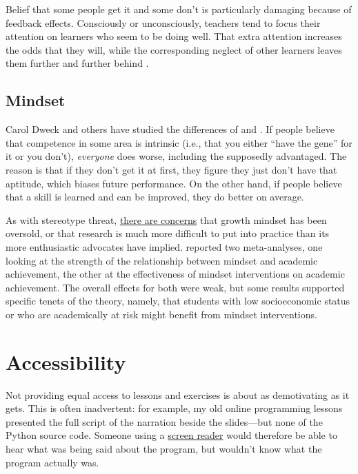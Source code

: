 Belief that some people get it and some don't is particularly damaging
because of feedback effects. Consciously or unconsciously, teachers tend
to focus their attention on learners who seem to be doing well. That
extra attention increases the odds that they will, while the
corresponding neglect of other learners leaves them further and further
behind \cite{Alvi1999,Brop1983,Juss2005}.

\subsection*{Mindset}

Carol Dweck and others have studied the differences of
 and
. If people believe that
competence in some area is intrinsic (i.e., that you either ``have the
gene'' for it or you don't), \emph{everyone} does worse, including the
supposedly advantaged. The reason is that if they don't get it at first,
they figure they just don't have that aptitude, which biases future
performance. On the other hand, if people believe that a skill is
learned and can be improved, they do better on average.

As with stereotype threat, \href{https://educhatter.wordpress.com/2017/03/26/growth-mindset-is-the-theory-flawed-or-has-gm-been-debased-in-the-classroom/}{there are concerns}
that growth mindset has been oversold, or that research is much more
difficult to put into practice than its more enthusiastic advocates
have implied. \cite{Sisk2018} reported two meta-analyses, one
looking at the strength of the relationship between mindset and
academic achievement, the other at the effectiveness of mindset
interventions on academic achievement. The overall effects for both
were weak, but some results supported specific tenets of the theory,
namely, that students with low socioeconomic status or who are
academically at risk might benefit from mindset interventions.

\section{Accessibility}\label{s:motivation-accessibility}

Not providing equal access to lessons and exercises is about as
demotivating as it gets. This is often inadvertent: for example, my
old online programming lessons presented the full script of the
narration beside the slides---but none of the Python source
code. Someone using a \href{https://en.wikipedia.org/wiki/Screen\_reader}{screen reader} would therefore
be able to hear what was being said about the program, but wouldn't
know what the program actually was.

